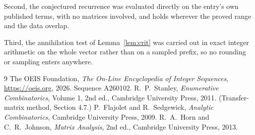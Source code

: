 \documentclass[11pt,a4paper]{article}
\theoremstyle{plain}
\theoremstyle{definition}
\begin{document}
Second, the conjectured recurrence was evaluated directly on the entry's own published terms,
with no matrices involved, and holds wherever the proved range and the data overlap.

Third, the annihilation test of Lemma~\ref{lem:crit} was carried out in exact integer
arithmetic on the whole vector rather than on a sampled prefix, so no rounding or sampling
enters anywhere.

\begin{thebibliography}{9}
 The OEIS Foundation, \emph{The On-Line Encyclopedia of Integer
Sequences}, \url{https://oeis.org}, 2026. Sequence A260102.
 R.~P.~Stanley, \emph{Enumerative Combinatorics}, Volume 1, 2nd ed.,
Cambridge University Press, 2011. (Transfer-matrix method, Section 4.7.)
 P.~Flajolet and R.~Sedgewick, \emph{Analytic Combinatorics}, Cambridge
University Press, 2009.
 R.~A.~Horn and C.~R.~Johnson, \emph{Matrix Analysis}, 2nd ed., Cambridge
University Press, 2013.
\end{thebibliography}
\end{document}
